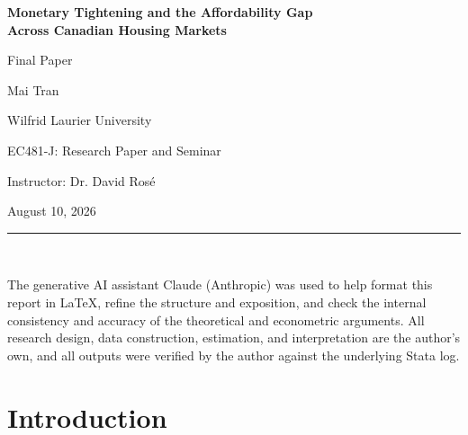 \documentclass[12pt]{article}
\begin{document}

\begin{titlepage}
\centering
\vspace*{2.5cm}

{\Large\bfseries Monetary Tightening and the Affordability Gap\\[0.3em]
Across Canadian Housing Markets\par}

\vspace{0.6cm}
{\large Final Paper\par}

\vspace{3cm}

\vspace{0.4cm}
Mai Tran

\vspace{0.4cm}
Wilfrid Laurier University

\vspace{0.2cm}
EC481-J: Research Paper and Seminar

\vspace{0.2cm}
Instructor: Dr. David Ros\'e

\vspace{0.2cm}
August 10, 2026

\vfill
\noindent\rule{\textwidth}{0.4pt}\\[0.3em]
{\footnotesize The generative AI assistant Claude (Anthropic) was used to help format this report in \LaTeX, refine the structure and exposition, and check the internal consistency and accuracy of the theoretical and econometric arguments. All research design, data construction, estimation, and interpretation are the author's own, and all outputs were verified by the author against the underlying Stata log.\par}

\end{titlepage}

\doublespacing
\setcounter{page}{1}

\section{Introduction}
\end{document}
